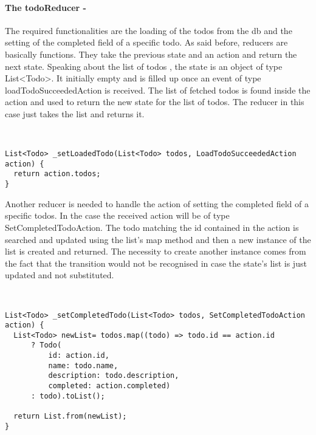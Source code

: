 \paragraph{The todoReducer - }
\label{subpar:todo_app_bloc_core_state}
The required functionalities are the loading of the todos from the db and the setting of the completed field of a specific todo. As said before, reducers are basically functions. They take the previous state and an action and return the next state. Speaking about the list of todos , the state is an object of type List<Todo>. It initially empty and is filled up once an event of type loadTodoSucceededAction is received. The list of fetched todos is found inside the action and used to return the new state for the list of todos. The reducer in this case just takes the list and returns it.
\begin{code}
\mbox{}\\
 \mbox{}
		\label{code:2.14}
\begin{verbatim}
List<Todo> _setLoadedTodo(List<Todo> todos, LoadTodoSucceededAction action) {
  return action.todos;
}
\end{verbatim}
\mbox{}
\end{code}

Another reducer is needed to handle the action of setting the completed field of a specific todos. In the case the received action will be of type SetCompletedTodoAction. The todo matching the id contained in the action is searched and updated using the list’s map method and then a new instance of the list is created and returned. The necessity to create another instance comes from the fact that the transition would not be recognised in case the state’s list is just updated and not substituted.
\begin{code}
\mbox{}\\
 \mbox{}
		\label{code:2.14}
\begin{verbatim}
List<Todo> _setCompletedTodo(List<Todo> todos, SetCompletedTodoAction action) {
  List<Todo> newList= todos.map((todo) => todo.id == action.id
      ? Todo(
          id: action.id,
          name: todo.name,
          description: todo.description,
          completed: action.completed)
      : todo).toList();

  return List.from(newList);
}
\end{verbatim}
\mbox{}
\end{code}


